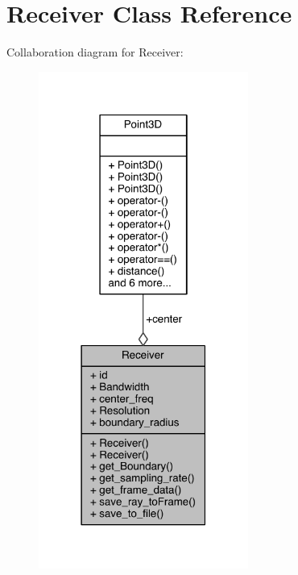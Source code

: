 \hypertarget{class_receiver}{}\section{Receiver Class Reference}
\label{class_receiver}


Collaboration diagram for Receiver\+:
\nopagebreak
\begin{figure}[H]
\begin{center}
\leavevmode
\includegraphics[width=195pt]{doxygen/latex/class_receiver__coll__graph}
\end{center}
\end{figure}

